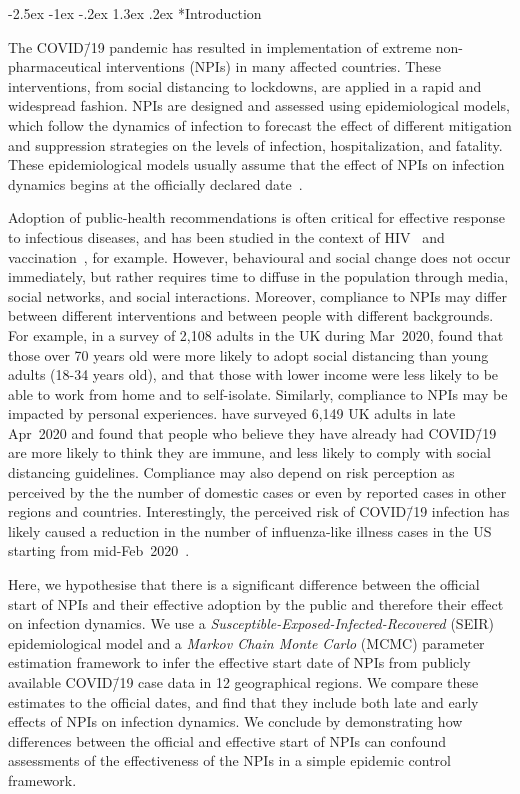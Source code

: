\documentclass[12pt]{extarticle}
\makeatletter
\renewcommand\section{\@startsection {section}{1}{\z@}%
     {-2.5ex \@plus -1ex \@minus -.2ex}%
     {1.3ex \@plus.2ex}%
    {\Large\bfseries}}
\newcommand{\covid}{COVID\=/19 }
\makeatother
\begin{document}
\section*{Introduction}

The \covid pandemic has resulted in implementation of extreme non-pharmaceutical interventions (NPIs) in many affected countries. These interventions, from social distancing to lockdowns, are applied in a rapid and widespread fashion.
NPIs are designed and assessed using epidemiological models, which follow the dynamics of infection to forecast the effect of different mitigation and suppression strategies on the levels of infection, hospitalization, and fatality.
These epidemiological models usually assume that the effect of NPIs on infection dynamics begins at the officially declared date~\citep{Flaxman2020,Gatto2020,Li2020}.

Adoption of public-health recommendations is often critical for effective response to infectious diseases, and has been studied in the context of HIV~\citep{Kaufman2014} and vaccination~\citep{Dunn2015,Wiyeh2018}, for example.
However, behavioural and social change does not occur immediately, but rather requires time to diffuse in the population through media, social networks, and social interactions. 
Moreover, compliance to NPIs may differ between different interventions and between people with different backgrounds.
For example, in a survey of 2,108 adults in the UK during Mar~2020, \citet{Atchison2020} found that those over 70 years old were more likely to adopt social distancing than young adults (18-34 years old), and that those with lower income were less likely to be able to work from home and to self-isolate.
Similarly, compliance to NPIs may be impacted by personal experiences. \citet{Smith2020} have surveyed 6,149 UK adults in late Apr~2020 and found that people who believe they have already had \covid are more likely to think they are immune, and less likely to comply with social distancing guidelines. 
Compliance may also depend on risk perception as perceived by the the number of domestic cases or even by reported cases in other regions and countries.
Interestingly, the perceived risk of \covid infection has likely caused a reduction in the number of influenza-like illness cases in the US starting from mid-Feb~2020~\citep{Zipfel2020}.

Here, we hypothesise that there is a significant difference between the official start of NPIs and their effective adoption by the public and therefore their effect on infection dynamics.
We use a \textit{Susceptible-Exposed-Infected-Recovered} (SEIR) epidemiological model and a \textit{Markov Chain Monte Carlo} (MCMC) parameter estimation framework to infer the effective start date of NPIs from publicly available \covid case data in 12 geographical regions.
We compare these estimates to the official dates, and find that they include both late and early effects of NPIs on infection dynamics.
We conclude by demonstrating how differences between the official and effective start of NPIs can confound assessments of the effectiveness of the NPIs in a simple epidemic control framework.
\end{document}
